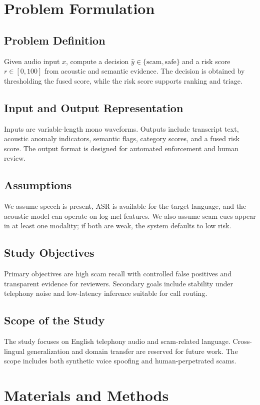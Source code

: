 \documentclass[11pt,a4paper]{article}
\begin{document}
\section{Problem Formulation}
\subsection{Problem Definition}
Given audio input $x$, compute a decision $\hat{y} \in \{\text{scam}, \text{safe}\}$ and a risk score $r \in [0,100]$ from acoustic and semantic evidence. The decision is obtained by thresholding the fused score, while the risk score supports ranking and triage.

\subsection{Input and Output Representation}
Inputs are variable-length mono waveforms. Outputs include transcript text, acoustic anomaly indicators, semantic flags, category scores, and a fused risk score. The output format is designed for automated enforcement and human review.

\subsection{Assumptions}
We assume speech is present, ASR is available for the target language, and the acoustic model can operate on log-mel features. We also assume scam cues appear in at least one modality; if both are weak, the system defaults to low risk.

\subsection{Study Objectives}
Primary objectives are high scam recall with controlled false positives and transparent evidence for reviewers. Secondary goals include stability under telephony noise and low-latency inference suitable for call routing.

\subsection{Scope of the Study}
The study focuses on English telephony audio and scam-related language. Cross-lingual generalization and domain transfer are reserved for future work. The scope includes both synthetic voice spoofing and human-perpetrated scams.

\section{Materials and Methods}
\end{document}
